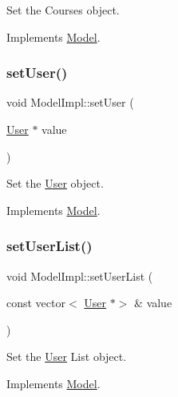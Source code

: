 Set the Courses object. 



Implements \hyperlink{classModel_a9a4cc2b97cd97bc987f019dca7aa5d9e}{Model}.

\mbox{\label{classModelImpl_a9e1a1953a4d3355e147515c2a0b3c031}} 
\subsubsection{\texorpdfstring{set\+User()}{setUser()}}
{\footnotesize\ttfamily void Model\+Impl\+::set\+User (\begin{DoxyParamCaption}\item[{\hyperlink{classUser}{User} $\ast$}]{value }\end{DoxyParamCaption})\hspace{0.3cm}{\ttfamily [virtual]}}



Set the \hyperlink{classUser}{User} object. 



Implements \hyperlink{classModel_aae120afc85d42a7bedee5405911986a5}{Model}.

\mbox{\label{classModelImpl_a617c58790e2b2207a3ce7e860a56e3a1}} 
\subsubsection{\texorpdfstring{set\+User\+List()}{setUserList()}}
{\footnotesize\ttfamily void Model\+Impl\+::set\+User\+List (\begin{DoxyParamCaption}\item[{const vector$<$ \hyperlink{classUser}{User} $\ast$$>$ \&}]{value }\end{DoxyParamCaption})\hspace{0.3cm}{\ttfamily [virtual]}}



Set the \hyperlink{classUser}{User} List object. 



Implements \hyperlink{classModel_affa0ad47e9417b52eca3b73105bad9f0}{Model}.

\mbox{\label{classModelImpl_aec25920972acddf92114b2b3581b9d66}} 
